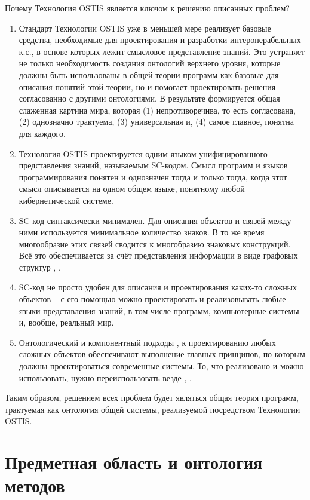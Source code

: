 Почему Технология OSTIS является ключом к решению описанных проблем?
\begin{enumerate}
    \item {Стандарт Технологии OSTIS \cite{Standard2021} уже в меньшей мере реализует базовые средства, необходимые для проектирования и разработки интероперабельных к.с., в основе которых лежит смысловое представление знаний. Это устраняет не только необходимость создания онтологий верхнего уровня, которые должны быть использованы в общей теории программ как базовые для описания понятий этой теории, но и помогает проектировать решения согласованно с другими онтологиями. В результате формируется общая слаженная картина мира, которая (1) непротиворечива, то есть согласована, (2) однозначно трактуема, (3) универсальная и, (4) самое главное, понятна для каждого.}
    \item {Технология OSTIS проектируется одним языком унифицированного представления знаний, называемым SC-кодом. Смысл программ и языков программирования понятен и однозначен тогда и только тогда, когда этот смысл описывается на одном общем языке, понятному любой кибернетической системе.}
    \item {SC-код синтаксически минимален. Для описания объектов и связей между ними используется минимальное количество знаков. В то же время многообразие этих связей сводится к многобразию знаковых конструкций. Всё это обеспечивается за счёт представления информации в виде графовых структур \cite{Kasyanov2003}, \cite{Petrov1978}.}
    \item {SC-код не просто удобен для описания и проектирования каких-то сложных объектов -- с его помощью можно проектировать и реализовывать любые языки представления знаний, в том числе программ, компьютерные системы и, вообще, реальный мир.}
    \item {Онтологический и компонентный подходы \cite{Sales2022}, \cite{Samaa2020} к проектированию любых сложных объектов обеспечивают выполнение главных принципов, по которым должны проектироваться современные системы. То, что реализовано и можно использовать, нужно переиспользовать везде \cite{O4IS2007}, \cite{Molorodov2019}.}
\end{enumerate}

Таким образом, решением всех проблем будет являться общая теория программ, трактуемая как онтология общей системы, реализуемой посредством Технологии OSTIS.

\section{Предметная область и онтология методов}
\label{sec_programs_sd_and_onotology_of_methods}


